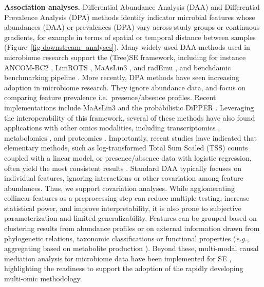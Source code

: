 \documentclass[
  sn-nature,
]{sn-jnl}
\begin{document}
\textbf{Association analyses.} Differential Abundance Analysis (DAA) and
Differential Prevalence Analysis (DPA) methods identify indicator
microbial features whose abundances (DAA) or prevalences (DPA) vary
across study groups or continuous gradients, for example in terms of
spatial or temporal distance between samples
(Figure~\ref{fig-downstream_analyses}). Many widely used DAA methods
used in microbiome research support the (Tree)SE framework, including
for instance ANCOM-BC2 \citep{lin2024}, LimROTS \citep{anwar2025},
MaAsLin3 \citep{nickols2026}, and radEmu \citep{clausen2026}, and
benchdamic benchmarking pipeline \citep{calgaro2022}. More recently, DPA
methods have seen increasing adoption in microbiome research. They
ignore abundance data, and focus on comparing feature prevalence
i.e.~presence/absence profiles. Recent implementations include MaAsLin3
\citep{nickols2026} and the probabilistic DiPPER \citep{pelto2026}.
Leveraging the interoperability of this framework, several of these
methods have also found applications with other omics modalities,
including transcriptomics \citep{love2014}, metabolomics
\citep{nickols2026}, and proteomics \citep{anwar2025}. Importantly,
recent studies have indicated that elementary methods, such as
log-transformed Total Sum Scaled (TSS) counts coupled with a linear
model, or presence/absence data with logistic regression, often yield
the most consistent results \citep{pelto2025, gamboa-tuz2025}. Standard
DAA typically focuses on individual features, ignoring interactions or
other covariation among feature abundances. Thus, we support covariation
analyses. While agglomerating collinear features as a preprocessing step
can reduce multiple testing, increase statistical power, and improve
interpretability, it is also prone to subjective parameterization and
limited generalizability. Features can be grouped based on clustering
results from abundance profiles or on external information drawn from
phylogenetic relations, taxonomic classifications or functional
properties (\emph{e.g.}, aggregating based on metabolite production
\citep{kullberg2024}). Beyond these, multi-modal causal mediation
analysis for microbiome data have been implemented for SE
\citep{jiang2025}, highlighting the readiness to support the adoption of
the rapidly developing multi-omic methodology.
\end{document}
